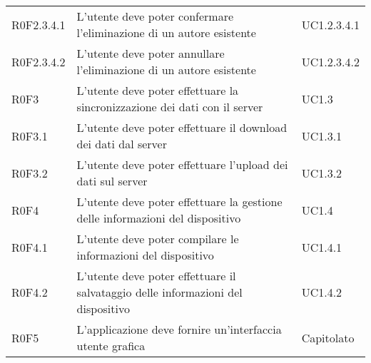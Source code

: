 \begin{longtable}{lp{}l}
R0F2.3.4.1
& L'utente deve poter confermare l'eliminazione di un autore esistente
& UC1.2.3.4.1 \\
R0F2.3.4.2
& L'utente deve poter annullare l'eliminazione di un autore esistente
& UC1.2.3.4.2 \\
R0F3
& L'utente deve poter effettuare la sincronizzazione dei dati con il server
& UC1.3 \\
R0F3.1
& L'utente deve poter effettuare il download dei dati dal server
& UC1.3.1 \\
R0F3.2
& L'utente deve poter effettuare l'upload dei dati sul server
& UC1.3.2 \\
R0F4
& L'utente deve poter effettuare la gestione delle informazioni del dispositivo
& UC1.4 \\
R0F4.1
& L'utente deve poter compilare le informazioni del dispositivo
& UC1.4.1 \\
R0F4.2
& L'utente deve poter effettuare il salvataggio delle informazioni del dispositivo
& UC1.4.2 \\
R0F5
& L'applicazione deve fornire un'interfaccia utente grafica
& Capitolato \\
\end{longtable}